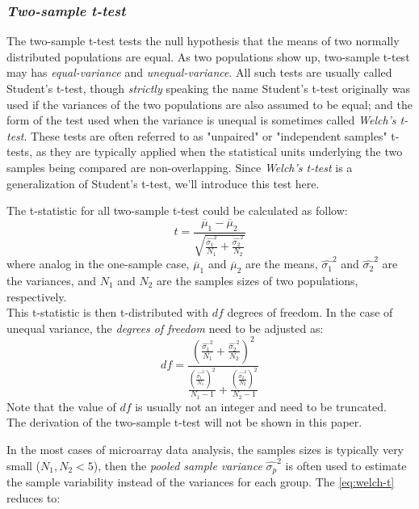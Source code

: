 \subsubsection{\it Two-sample t-test}
The two-sample t-test tests the null hypothesis that the means of two normally distributed populations are equal. As two populations show up, two-sample t-test may has {\it equal-variance} and {\it unequal-variance}.
All such tests are usually called Student's t-test, though {\it strictly} speaking the name Student's t-test originally was used if the variances of the two populations are also assumed to be equal; and the form of the test used when the variance is unequal is sometimes called {\it Welch's t-test}. These tests are often referred to as "unpaired" or "independent samples" t-tests, as they are typically applied when the statistical units underlying the two samples being compared are non-overlapping. Since {\it Welch's t-test} is a generalization of Student's t-test, we'll introduce this test here.
\begin{definition}
	The t-statistic for all two-sample t-test could be calculated as follow:
	\begin{equation} \label{eq:welch-t}
		t = \frac	{\overline \mu_1 - \overline \mu_2}
					{ \sqrt{ \frac{\hat{\sigma_1}^2}{N_1} + \frac{\hat{\sigma_2}^2}{N_2} } } 
	\end{equation}
	where analog in the one-sample case, $\overline \mu_1$ and $\overline \mu_2$ are the means, $\hat{\sigma_1}^2$ and $\hat{\sigma_2}^2$ are the variances, and $N_1$ and $N_2$ are the samples sizes of two populations, respectively.\\
	This t-statistic is then t-distributed with $df$ degrees of freedom.	
	In the case of unequal variance, the {\it degrees of freedom} need to be adjusted as:
	\begin{equation} \label{eq:dof}
		df	= \frac	{\left( \frac{\hat{\sigma_1}^2}{N_1} + \frac{\hat{\sigma_2}^2}{N_2}\right)^2}
					{ \frac{ (\frac{\hat{\sigma_1}^2}{N_1})^2 }{N_1-1} + \frac{ (\frac{\hat{\sigma_2}^2}{N_2})^2 }{N_2-1}}
	\end{equation}
	Note that the value of $df$ is usually not an integer and need to be truncated.\\
	The derivation of the two-sample t-test will not be shown in this paper. \\
\end{definition}
In the most cases of microarray data analysis, the samples sizes is typically very small ($N_1, N_2 < 5$), then the {\it pooled sample variance} $\hat{\sigma_p}^2$ is often used to estimate the sample variability instead of the variances for each group. The \autoref{eq:welch-t} reduces to:
